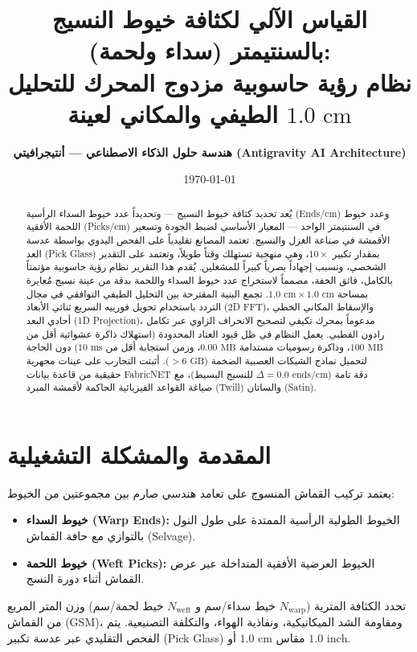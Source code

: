 \documentclass[11pt,a4paper]{article}
\title{\textbf{القياس الآلي لكثافة خيوط النسيج بالسنتيمتر (سداء ولحمة):}\\\large نظام رؤية حاسوبية مزدوج المحرك للتحليل الطيفي والمكاني لعينة $1.0\text{ cm}$}
\author{\textbf{هندسة حلول الذكاء الاصطناعي — أنتيجرافيتي (Antigravity AI Architecture)}}
\date{\today}
\begin{document}
\maketitle

\begin{abstract}
يُعد تحديد كثافة خيوط النسيج — وتحديداً عدد خيوط السداء الرأسية (Ends/cm) وعدد خيوط اللحمة الأفقية (Picks/cm) في السنتيمتر الواحد — المعيار الأساسي لضبط الجودة وتسعير الأقمشة في صناعة الغزل والنسيج. تعتمد المصانع تقليدياً على الفحص اليدوي بواسطة عدسة العد (Pick Glass) بمقدار تكبير $10\times$، وهي منهجية تستهلك وقتاً طويلاً، وتعتمد على التقدير الشخصي، وتسبب إجهاداً بصرياً كبيراً للمشغلين. يُقدم هذا التقرير نظام رؤية حاسوبية مؤتمتاً بالكامل، فائق الخفة، مصمماً لاستخراج عدد خيوط السداء واللحمة بدقة من عينة نسيج مُعايرة بمساحة $1.0\text{ cm} \times 1.0\text{ cm}$. تجمع البنية المقترحة بين التحليل الطيفي التوافقي في مجال التردد باستخدام تحويل فورييه السريع ثنائي الأبعاد (2D FFT)، والإسقاط المكاني الخطي أحادي البعد (1D Projection)، مدعوماً بمحرك تكيفي لتصحيح الانحراف الزاوي عبر تكامل رادون القطبي. يعمل النظام في ظل قيود العتاد المحدودة (استهلاك ذاكرة عشوائية أقل من $100\text{ MB}$، وذاكرة رسوميات مستدامة $0.00\text{ MB}$، وزمن استجابة أقل من $10\text{ ms}$) دون الحاجة لتحميل نماذج الشبكات العصبية الضخمة ($> 6\text{ GB}$). أثبتت التجارب على عينات مجهرية حقيقية من قاعدة بيانات FabricNET دقة تامة ($\Delta = 0.0\text{ ends/cm}$ للنسيج البسيط)، مع صياغة القواعد الفيزيائية الحاكمة لأقمشة المبرد (Twill) والساتان (Satin).
\end{abstract}

\section{المقدمة والمشكلة التشغيلية}

يعتمد تركيب القماش المنسوج على تعامد هندسي صارم بين مجموعتين من الخيوط:
\begin{itemize}
    \item \textbf{خيوط السداء (Warp Ends):} الخيوط الطولية الرأسية الممتدة على طول النول بالتوازي مع حافة القماش (Selvage).
    \item \textbf{خيوط اللحمة (Weft Picks):} الخيوط العرضية الأفقية المتداخلة عبر عرض القماش أثناء دورة النسج.
\end{itemize}

تحدد الكثافة المترية ($N_{\text{warp}}$ خيط سداء/سم و $N_{\text{weft}}$ خيط لحمة/سم) وزن المتر المربع من القماش (GSM)، ومقاومة الشد الميكانيكية، ونفاذية الهواء، والتكلفة التصنيعية. يتم الفحص التقليدي عبر عدسة تكبير (Pick Glass) مقاس $1.0\text{ cm}$ أو $1.0\text{ inch}$.
\end{document}
